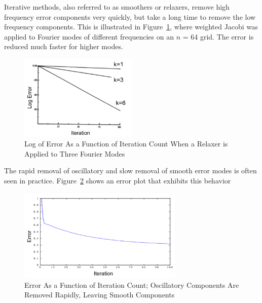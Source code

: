 Iterative methods, also referred to as smoothers or relaxers, remove high frequency error components very quickly, but take a long time to remove the low frequency components. This is illustrated in Figure~\ref{fig:FourierError}, where weighted Jacobi was applied to Fourier modes of different frequencies on an $n$ = 64 grid. The error is reduced much faster for higher modes. 
%
\begin{figure}[!ht]
    \begin{center}
      \includegraphics [width=0.5\textwidth, height=0.3\textheight] {FourierError}
   \end{center}
   \caption{Log of Error As a Function of Iteration Count When a Relaxer is Applied to Three Fourier Modes \cite{Briggs2000}}
   \label{fig:FourierError}
\end{figure}
%
The rapid removal of oscillatory and slow removal of smooth error modes is often seen in practice. Figure~\ref{fig:MGerrorExample} shows an error plot that exhibits this behavior
%
\begin{figure}[!ht]
    \begin{center}
      \includegraphics [width=0.7\textwidth, height=0.4\textheight] {MGerrorExample}
   \end{center}
   \caption{Error As a Function of Iteration Count; Oscillatory Components Are Removed Rapidly, Leaving Smooth Components \cite{Briggs2000}}
   \label{fig:MGerrorExample}
\end{figure}


